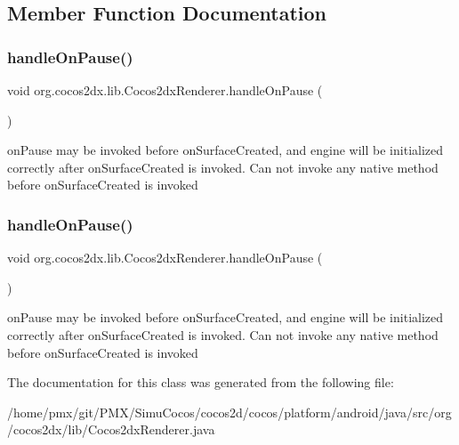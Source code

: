 \subsection{Member Function Documentation}
\mbox{\label{classorg_1_1cocos2dx_1_1lib_1_1Cocos2dxRenderer_a253bb3076421742699afad4404a27dcd}} 
\subsubsection{\texorpdfstring{handle\+On\+Pause()}{handleOnPause()}\hspace{0.1cm}{\footnotesize\ttfamily [1/2]}}
{\footnotesize\ttfamily void org.\+cocos2dx.\+lib.\+Cocos2dx\+Renderer.\+handle\+On\+Pause (\begin{DoxyParamCaption}{ }\end{DoxyParamCaption})\hspace{0.3cm}{\ttfamily [inline]}}

on\+Pause may be invoked before on\+Surface\+Created, and engine will be initialized correctly after on\+Surface\+Created is invoked. Can not invoke any native method before on\+Surface\+Created is invoked\mbox{\label{classorg_1_1cocos2dx_1_1lib_1_1Cocos2dxRenderer_a253bb3076421742699afad4404a27dcd}} 
\subsubsection{\texorpdfstring{handle\+On\+Pause()}{handleOnPause()}\hspace{0.1cm}{\footnotesize\ttfamily [2/2]}}
{\footnotesize\ttfamily void org.\+cocos2dx.\+lib.\+Cocos2dx\+Renderer.\+handle\+On\+Pause (\begin{DoxyParamCaption}{ }\end{DoxyParamCaption})\hspace{0.3cm}{\ttfamily [inline]}}

on\+Pause may be invoked before on\+Surface\+Created, and engine will be initialized correctly after on\+Surface\+Created is invoked. Can not invoke any native method before on\+Surface\+Created is invoked

The documentation for this class was generated from the following file\+:\begin{DoxyCompactItemize}
\item 
/home/pmx/git/\+P\+M\+X/\+Simu\+Cocos/cocos2d/cocos/platform/android/java/src/org/cocos2dx/lib/Cocos2dx\+Renderer.\+java\end{DoxyCompactItemize}
